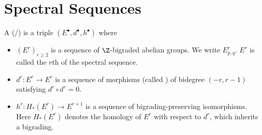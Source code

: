 \documentclass[wip, topology]{bsteffan-lecturenotes}
\begin{document}
\section{Spectral Sequences}
\begin{definition}
	A (/)  is a triple $(E^\bullet, d^\bullet, h^\bullet)$ where
	\begin{itemize}
		\item $(E^r)_{r \geq 2}$ is a sequence of $\Z$-bigraded abelian groups.
			We write $E^r_{p, q}$.
			$E^r$ is called the $r$th  of the spectral sequence.
		\item $d^r\colon E^r \to E^r$ is a sequence of morphisms (called ) of bidegree $(-r, r - 1)$ satisfying $d^r \circ d^r = 0$.
		\item $h^r\colon H_*(E^r) \to E^{r + 1}$ is a sequence of bigrading-preserving isomorphisms.
			Here $H_*(E^r)$ denotes the homology of $E^r$ with respect to $d^r$, which inherits a bigrading.
	\end{itemize}
\end{definition}
\end{document}
